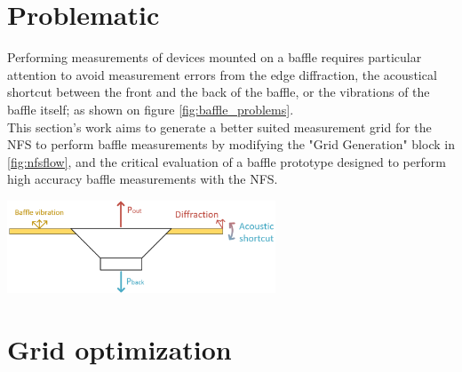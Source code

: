 \documentclass{report}
\begin{document}
\section{Problematic}

Performing measurements of devices mounted on a baffle requires particular attention to avoid measurement errors from the edge diffraction, the acoustical shortcut between the front and the back of the baffle, or the vibrations of the baffle itself; as shown on figure \ref{fig:baffle_problems}. \\
This section's work aims to generate a better suited measurement grid for the NFS to perform baffle measurements by modifying the "Grid Generation" block in \ref{fig:nfsflow}, and the critical evaluation of a baffle prototype designed to perform high accuracy baffle measurements with the NFS. 

\begin{center}
	\includegraphics[width=0.6\textwidth]{GridOpti/baffle_problems} 
    \captionsetup{hypcap=false} 
	\label{fig:baffle_problems}
\end{center}



\section{Grid optimization}
\end{document}
